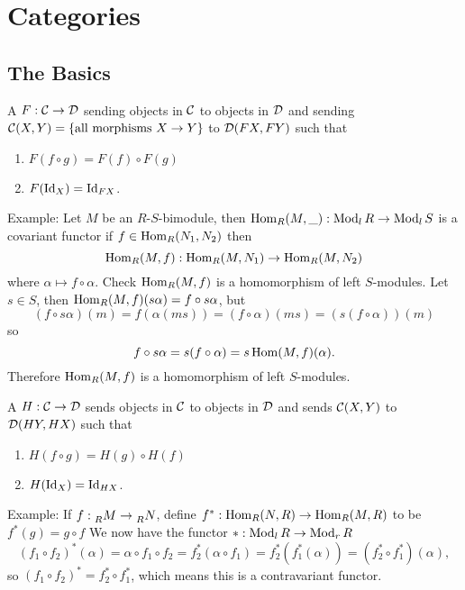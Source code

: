 \chapter{Categories}

\section{The Basics}

  \begin{define}
    A  $F:\mathcal{C}\to \mathcal{D}$ sending objects in $\mathcal{C}$ to objects
    in $\mathcal{D}$ and sending $\mathcal{C}(X,Y) = \{ \text{all morphisms } X\to Y\}$ to
    $\mathcal{D}(FX, FY)$ such that
    \begin{enumerate}
      \item $F(f\circ g) = F(f)\circ F(g)$
      \item $F(\operatorname{Id}_X) = \operatorname{Id}_{FX}$.
    \end{enumerate}
  \end{define}

  Example: Let $M$ be an $R$-$S$-bimodule, then
  $\operatorname{Hom}_R(M,\_): \operatorname{Mod}_l R\to \operatorname{Mod}_l S$ is a covariant functor if
  $f\in \operatorname{Hom}_R(N_1, N_2)$ then
  \[ \operatorname{Hom}_R(M,f): \operatorname{Hom}_R(M,N_1) \to \operatorname{Hom}_R(M, N_2) \]
  where $\alpha \mapsto f\circ \alpha$. Check $\operatorname{Hom}_R(M,f)$ is a homomorphism
  of left $S$-modules. Let $s \in S$, then
  $\operatorname{Hom}_R(M,f)(s\alpha) = f\circ s\alpha$, but
  \[ (f\circ s\alpha)(m) = f(\alpha(ms)) = (f\circ \alpha)(ms)
  = (s(f\circ\alpha))(m)\]
  so
  \[ f\circ s\alpha = s(f\circ \alpha) = s\operatorname{Hom}(M,f)(\alpha).\]
  Therefore $\operatorname{Hom}_R(M,f)$ is a homomorphism of left $S$-modules.

  \begin{define}
    A  $H:\mathcal{C} \to \mathcal{D}$ sends objects in $\mathcal{C}$ to
    objects in $\mathcal{D}$ and sends $\mathcal{C}(X,Y)$ to $\mathcal{D}(HY, HX)$ such that
    \begin{enumerate}
      \item $H(f\circ g) = H(g)\circ H(f)$
      \item $H(\operatorname{Id}_X) = \operatorname{Id}_{HX}$.
    \end{enumerate}
  \end{define}

  Example: If $f:\prescript{}{R}{M}\to \prescript{}{R}{N}$, define
  $f^*:\operatorname{Hom}_R(N,R) \to \operatorname{Hom}_R(M,R)$ to be $f^*(g) = g\circ f$
  We now have the functor $*:\operatorname{Mod}_l{R}\to \operatorname{Mod}_r{R}$
  \[ (f_1\circ f_2)^*(\alpha) = \alpha \circ f_1 \circ f_2
    = f_2^*(\alpha\circ f_1) = f_2^*(f_1^*(\alpha))
  = (f_2^*\circ f_1^*)(\alpha), \]
  so $(f_1\circ f_2)^* = f_2^*\circ f_1^*$, which means this is a contravariant
  functor.

